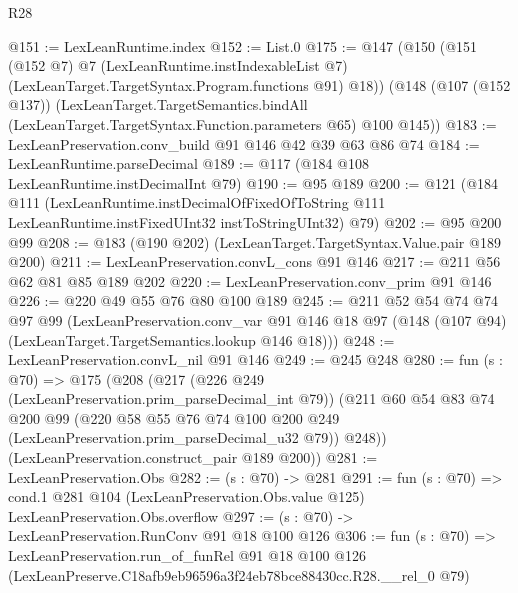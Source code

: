 \begin{lexlean}{R28}
\begin{coremodule}
@151 := LexLeanRuntime.index
@152 := List.{0}
@175 := @147
    (@150
      (@151
        (@152 @7)
        @7
        (LexLeanRuntime.instIndexableList @7)
        (LexLeanTarget.TargetSyntax.Program.functions @91)
        @18))
    (@148
      (@107 (@152 @137))
      (LexLeanTarget.TargetSemantics.bindAll
        (LexLeanTarget.TargetSyntax.Function.parameters @65)
        @100
        @145))
@183 := LexLeanPreservation.conv_build @91 @146 @42 @39 @63 @86 @74
@184 := LexLeanRuntime.parseDecimal
@189 := @117 (@184 @108 LexLeanRuntime.instDecimalInt @79)
@190 := @95 @189
@200 := @121
    (@184
      @111
      (LexLeanRuntime.instDecimalOfFixedOfToString
        @111
        LexLeanRuntime.instFixedUInt32
        instToStringUInt32)
      @79)
@202 := @95 @200 @99
@208 := @183 (@190 @202) (LexLeanTarget.TargetSyntax.Value.pair @189 @200)
@211 := LexLeanPreservation.convL_cons @91 @146
@217 := @211 @56 @62 @81 @85 @189 @202
@220 := LexLeanPreservation.conv_prim @91 @146
@226 := @220 @49 @55 @76 @80 @100 @189
@245 := @211
    @52
    @54
    @74
    @74
    @97
    @99
    (LexLeanPreservation.conv_var
      @91
      @146
      @18
      @97
      (@148 (@107 @94) (LexLeanTarget.TargetSemantics.lookup @146 @18)))
@248 := LexLeanPreservation.convL_nil @91 @146
@249 := @245 @248
@280 := fun (s : @70) =>
  @175
    (@208
      (@217
        (@226 @249 (LexLeanPreservation.prim_parseDecimal_int @79))
        (@211
          @60
          @54
          @83
          @74
          @200
          @99
          (@220 @58 @55 @76 @74 @100 @200 @249 (LexLeanPreservation.prim_parseDecimal_u32 @79))
          @248))
      (LexLeanPreservation.construct_pair @189 @200))
@281 := LexLeanPreservation.Obs
@282 := (s : @70) -> @281
@291 := fun (s : @70) =>
  cond.{1} @281 @104 (LexLeanPreservation.Obs.value @125) LexLeanPreservation.Obs.overflow
@297 := (s : @70) -> LexLeanPreservation.RunConv @91 @18 @100 @126
@306 := fun (s : @70) =>
  LexLeanPreservation.run_of_funRel
    @91
    @18
    @100
    @126
    (LexLeanPreserve.C18afb9eb96596a3f24eb78bce88430cc.R28.__rel_0 @79)
\end{coremodule}
\end{lexlean}
